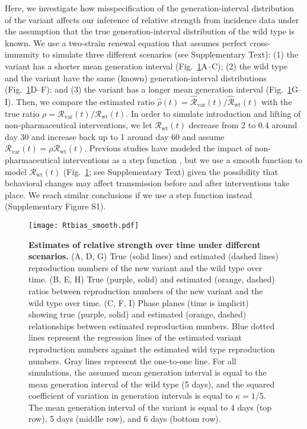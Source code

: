 \documentclass[12pt]{article}
\newcommand{\fref}[1]{Fig.~\ref{fig:#1}}
\newcommand{\vvvar}{\mathrm{var}}
\newcommand{\wwwt}{\mathrm{wt}}
\newcommand{\Rx}[1]{\ensuremath{{\mathcal R}_{#1}}\xspace}
\newcommand{\RR}{\ensuremath{{\mathcal R}}\xspace}
\newcommand{\Rw}{\Rx{\wwwt}}
\newcommand{\Rv}{\Rx{\vvvar}}
\begin{document}
Here, we investigate how misspecification of the generation-interval distribution of the variant affects our inference of relative strength from incidence data under the assumption that the true generation-interval distribution of the wild type is known.
We use a two-strain renewal equation that assumes perfect cross-immunity to simulate three different scenarios (see Supplementary Text):
(1) the variant has a shorter mean generation interval (\fref{Rtbias}A--C);
(2) the wild type and the variant have the same (known) generation-interval distributions (\fref{Rtbias}D--F); and
(3) the variant has a longer mean generation interval (\fref{Rtbias}G--I).
Then, we compare the estimated ratio $\hat{\rho}(t) = \hat{\RR}_{\textrm{var}}(t)/\hat{\RR}_{\textrm{wt}}(t)$ with the true ratio $\rho = \Rv(t)/\Rw(t)$.
In order to simulate introduction and lifting of non-pharmaceutical interventions, we let $\Rw(t)$ decrease from 2 to 0.4 around day 30 and increase back up to 1 around day 60 and assume $\Rv(t) = \rho \Rw(t)$.
Previous studies have modeled the impact of non-pharmaceutical interventions as a step function \citep{flaxman2020Rt}, but we use a smooth function to model $\Rw(t)$ (\fref{Rtbias}; see Supplementary Text) given the possibility that behavioral changes may affect transmission before and after interventions take place.
We reach similar conclusions if we use a step function instead (Supplementary Figure S1).

\begin{figure}[!pht]
\begin{center}
\texttt{[image: Rtbias\_smooth.pdf]}
\caption{
\textbf{Estimates of relative strength over time under different scenarios.}
(A, D, G) True (solid lines) and estimated (dashed lines) reproduction numbers of the new variant and the wild type over time.
(B, E, H) True (purple, solid) and estimated (orange, dashed) ratios between reproduction numbers of the new variant and the wild type over time.
(C, F, I) Phase planes (time is implicit) showing true (purple, solid) and estimated (orange, dashed) relationships between estimated reproduction numbers.
Blue dotted lines represent the regression lines of the estimated variant reproduction numbers against the estimated wild type reproduction numbers.
Gray lines represent the one-to-one line.
For all simulations, the assumed mean generation interval is equal to the mean generation interval of the wild type (5 days), and the squared coefficient of variation in generation intervals is equal to $\kappa = 1/5$.
The mean generation interval of the variant is equal to 4 days (top row), 5 days (middle row), and 6 days (bottom row).
}
\label{fig:Rtbias}
\end{center}
\end{figure}
\end{document}
